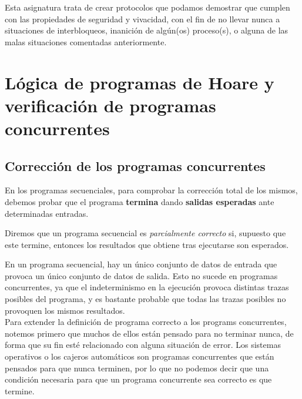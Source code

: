 Esta asignatura trata de crear protocolos que podamos demostrar que cumplen con las propiedades de seguridad y vivacidad, con el fin de no llevar nunca a situaciones de interbloqueos, inanición de algún(os) proceso(s), o alguna de las malas situaciones comentadas anteriormente.

\section{Lógica de programas de Hoare y verificación de programas concurrentes}
\subsection{Corrección de los programas concurrentes}
En los programas secuenciales, para comprobar la corrección total de los mismos, debemos probar que el programa \textbf{termina} dando \textbf{salidas esperadas} ante determinadas entradas.

Diremos que un programa secuencial es \textit{parcialmente correcto} si, supuesto que este termine, entonces los resultados que obtiene tras ejecutarse son esperados.

En un programa secuencial, hay un único conjunto de datos de entrada que provoca un único conjunto de datos de salida. Esto no sucede en programas concurrentes, ya que el indeterminismo en la ejecución provoca distintas trazas posibles del programa, y es bastante probable que todas las trazas posibles no provoquen los mismos resultados.\\

Para extender la definición de programa correcto a los programs concurrentes, notemos primero que muchos de ellos están pensado para no terminar nunca, de forma que su fin esté relacionado con alguna situación de error. Los sistemas operativos o los cajeros automáticos son programas concurrentes que están pensados para que nunca terminen, por lo que no podemos decir que una condición necesaria para que un programa concurrente sea correcto es que termine.\\

